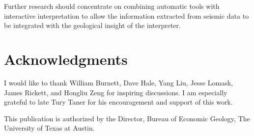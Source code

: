 Further research should concentrate on combining automatic tools with
interactive interpretation to allow the information extracted from
seismic data to be integrated with the geological insight of the
interpreter.

\section{Acknowledgments}

I would like to thank William Burnett, Dave Hale, Yang Liu, Jesse
Lomask, James Rickett, and Hongliu Zeng for inspiring discussions. I
am especially grateful to late Tury Taner for his encouragement and
support of this work.

This publication is authorized by the Director, Bureau 
of Economic Geology, The University of Texas at Austin.




